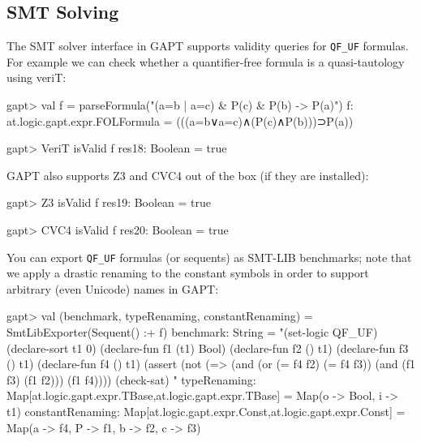 \documentclass[a4paper,11pt]{article}
\begin{document}

\subsection{SMT Solving}

The SMT solver interface in GAPT supports validity queries for \verb,QF_UF,
formulas.  For example we can check whether a quantifier-free formula is a
quasi-tautology using veriT:
\begin{clilisting}
gapt> val f = parseFormula("(a=b | a=c) & P(c) & P(b) -> P(a)")
f: at.logic.gapt.expr.FOLFormula = (((a=b∨a=c)∧(P(c)∧P(b)))⊃P(a))

gapt> VeriT isValid f
res18: Boolean = true

\end{clilisting}

GAPT also supports Z3 and CVC4 out of the box (if they are installed):
\begin{clilisting}
gapt> Z3 isValid f
res19: Boolean = true

gapt> CVC4 isValid f
res20: Boolean = true

\end{clilisting}

You can export \verb,QF_UF, formulas (or sequents) as SMT-LIB benchmarks;
note that we apply a drastic renaming to the constant symbols in order to
support arbitrary (even Unicode) names in GAPT:
\begin{clilisting}
gapt> val (benchmark, typeRenaming, constantRenaming) = SmtLibExporter(Sequent() :+ f)
benchmark: String =
"(set-logic QF_UF)
(declare-sort t1 0)
(declare-fun f1 (t1) Bool)
(declare-fun f2 () t1)
(declare-fun f3 () t1)
(declare-fun f4 () t1)
(assert (not (=> (and (or (= f4 f2) (= f4 f3)) (and (f1 f3) (f1 f2))) (f1 f4))))
(check-sat)
"
typeRenaming: Map[at.logic.gapt.expr.TBase,at.logic.gapt.expr.TBase] = Map(o -> Bool, i -> t1)
constantRenaming: Map[at.logic.gapt.expr.Const,at.logic.gapt.expr.Const] = Map(a -> f4, P -> f1, b -> f2, c -> f3)

\end{clilisting}
\end{document}
